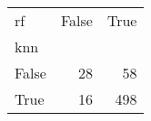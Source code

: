 \begin{tabular}{lrr}
\toprule
rf &  False &  True  \\
knn   &        &        \\
\midrule
False &     28 &     58 \\
True  &     16 &    498 \\
\bottomrule
\end{tabular}
